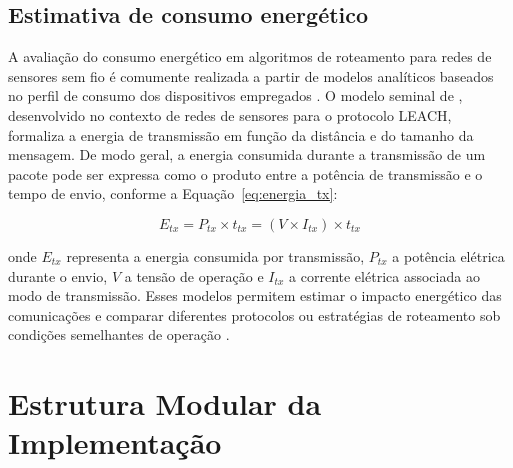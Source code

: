 \subsection{Estimativa de consumo
energético}\label{estimativa-de-consumo-energuxe9tico}

A avaliação do consumo energético em algoritmos de roteamento para redes
de sensores sem fio é comumente realizada a partir de modelos analíticos
baseados no perfil de consumo dos dispositivos empregados
\cite{karlwillig2005}. O modelo seminal de ,
desenvolvido no contexto de redes de sensores para o protocolo LEACH,
formaliza a energia de transmissão em função da distância e do tamanho
da mensagem. De modo geral, a energia consumida durante a transmissão de
um pacote pode ser expressa como o produto entre a potência de
transmissão e o tempo de envio, conforme a Equação~\ref{eq:energia_tx}:

\begin{equation}\label{eq:energia_tx}
  E_{tx} = P_{tx} \times t_{tx} = (V \times I_{tx}) \times t_{tx}
\end{equation}

\noindent onde $E_{tx}$ representa a energia consumida por transmissão,
$P_{tx}$ a potência elétrica durante o envio, $V$ a tensão de
operação e $I_{tx}$ a corrente elétrica associada ao modo de
transmissão. Esses modelos permitem estimar o impacto energético das
comunicações e comparar diferentes protocolos ou estratégias de
roteamento sob condições semelhantes de operação \cite{karlwillig2005}.

\section{Estrutura Modular da
Implementação}\label{estrutura-modular-da-implementauxe7uxe3o}

